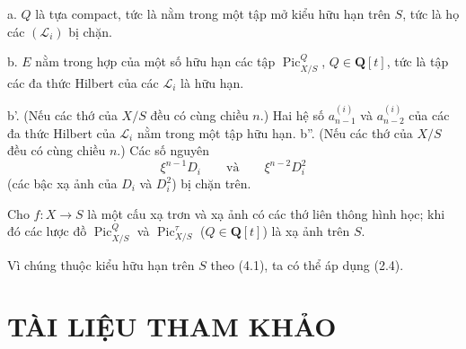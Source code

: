 \noindent a. $Q$ là tựa
compact, tức là nằm trong một tập mở kiểu hữu hạn trên $S$, tức là họ các
$(\mathcal L_i)$ bị chặn.

\noindent b. $E$ nằm trong hợp của một số hữu hạn các tập
$\operatorname{Pic}_{X/S}^Q$, $Q\in\mathbf Q[t]$, tức là tập các đa thức
Hilbert của các $\mathcal L_i$ là hữu hạn.

\noindent b'. (Nếu các thớ của $X/S$ đều có cùng chiều $n$.) Hai hệ số
$a_{n-1}^{(i)}$ và $a_{n-2}^{(i)}$ của các đa thức Hilbert của
$\mathcal L_i$ nằm trong một tập hữu hạn.
\noindent b''. (Nếu các thớ của $X/S$ đều có cùng chiều $n$.) Các số nguyên
\[
\xi^{n-1}D_i\qquad\text{và}\qquad\xi^{n-2}D_i^2
\]
(các bậc xạ ảnh của $D_i$ và $D_i^2$) bị chặn trên.

 Cho $f:X\longrightarrow S$ là một cấu xạ trơn và xạ ảnh
có các thớ liên thông hình học; khi đó các lược đồ
$\operatorname{Pic}_{X/S}^Q$ và $\operatorname{Pic}_{X/S}^\tau$
($Q\in\mathbf Q[t]$) là xạ ảnh trên $S$.

Vì chúng thuộc kiểu hữu hạn trên $S$ theo (4.1), ta có thể áp dụng (2.4).

\section*{TÀI LIỆU THAM KHẢO}

